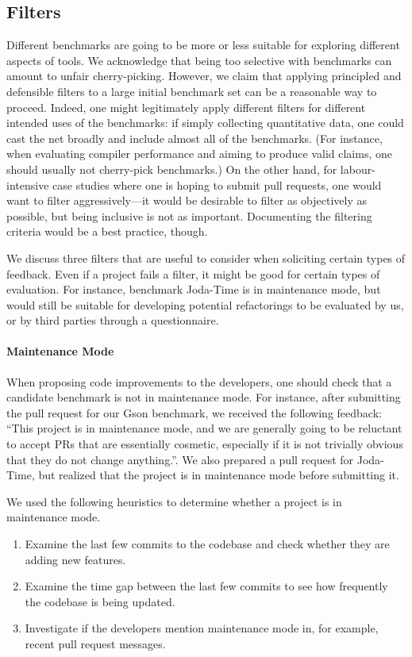 \subsection{Filters}
Different benchmarks are going to be more or less suitable for exploring different aspects of tools. We acknowledge that being too selective with benchmarks can amount to unfair cherry-picking. However, we claim that applying principled and defensible filters to a large initial benchmark set can be a reasonable way to proceed. Indeed, one might legitimately apply different filters for different intended uses of the benchmarks: if simply collecting quantitative data, one could cast the net broadly and include almost all of the benchmarks. (For instance, when evaluating compiler performance and aiming to produce valid claims, one should usually not cherry-pick benchmarks.) On the other hand, for labour-intensive case studies where one is hoping to submit pull requests, one would want to filter aggressively---it would be desirable to filter as objectively as possible, but being inclusive is not as important. Documenting the filtering criteria would be a best practice, though.

We discuss three filters that are useful to consider when soliciting certain types of feedback. Even if a project fails a filter, it might be good for certain types of evaluation. For instance, benchmark Joda-Time is in maintenance mode, but would still be suitable for developing potential refactorings to be evaluated by us, or by third parties through a questionnaire.

\paragraph{Maintenance Mode}
When proposing code improvements to the developers, one should check that a candidate benchmark is not in maintenance mode. For instance, after submitting the pull request for our Gson benchmark, we received the following feedback: ``This project is in maintenance mode, and we are generally going to be reluctant to accept PRs that are essentially cosmetic, especially if it is not trivially obvious that they do not change anything.''. We also prepared a pull request for Joda-Time, but realized that the project is in maintenance mode before submitting it.

We used the following heuristics to determine whether a project is in maintenance mode.
\begin{enumerate}
  \item Examine the last few commits to the codebase and check whether they are adding new features.
  \item Examine the time gap between the last few commits to see how frequently the codebase is being updated.
  \item Investigate if the developers mention maintenance mode in, for example, recent pull request messages.
\end{enumerate}

